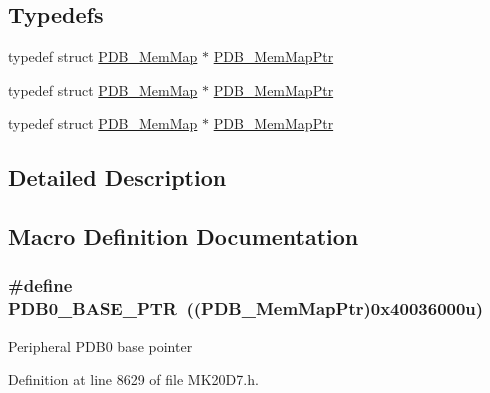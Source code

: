 \subsection*{Typedefs}
\begin{DoxyCompactItemize}
\item 
typedef struct \hyperlink{struct_p_d_b___mem_map}{P\+D\+B\+\_\+\+Mem\+Map} $\ast$ \hyperlink{group___p_d_b___peripheral_ga99a192ea14b33afb792a0de304e131be}{P\+D\+B\+\_\+\+Mem\+Map\+Ptr}
\item 
typedef struct \hyperlink{struct_p_d_b___mem_map}{P\+D\+B\+\_\+\+Mem\+Map} $\ast$ \hyperlink{group___p_d_b___peripheral_ga99a192ea14b33afb792a0de304e131be}{P\+D\+B\+\_\+\+Mem\+Map\+Ptr}
\item 
typedef struct \hyperlink{struct_p_d_b___mem_map}{P\+D\+B\+\_\+\+Mem\+Map} $\ast$ \hyperlink{group___p_d_b___peripheral_ga99a192ea14b33afb792a0de304e131be}{P\+D\+B\+\_\+\+Mem\+Map\+Ptr}
\end{DoxyCompactItemize}


\subsection{Detailed Description}


\subsection{Macro Definition Documentation}
\subsubsection[{\texorpdfstring{P\+D\+B0\+\_\+\+B\+A\+S\+E\+\_\+\+P\+TR}{PDB0_BASE_PTR}}]{\setlength{\rightskip}{0pt plus 5cm}\#define P\+D\+B0\+\_\+\+B\+A\+S\+E\+\_\+\+P\+TR~(({\bf P\+D\+B\+\_\+\+Mem\+Map\+Ptr})0x40036000u)}\hypertarget{group___p_d_b___peripheral_ga8e197b7c43fd7a0bf1a38caa1918b7b5}{}\label{group___p_d_b___peripheral_ga8e197b7c43fd7a0bf1a38caa1918b7b5}
Peripheral P\+D\+B0 base pointer 

Definition at line 8629 of file M\+K20\+D7.\+h.

